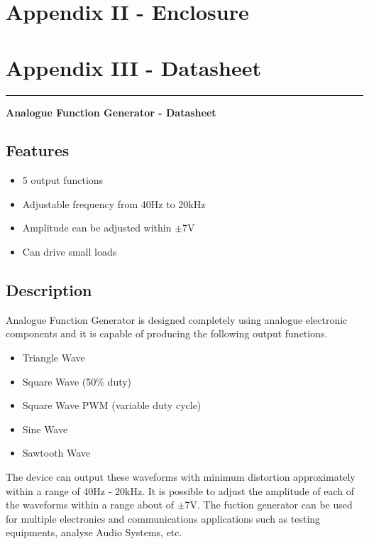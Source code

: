\documentclass[11pt]{article}
\begin{document}
\section{Appendix II - Enclosure}




\newpage

\section{Appendix III - Datasheet}

\rule{\textwidth}{0.5pt}

\begin{center}
    \begin{large}
    \textbf{Analogue Function Generator - Datasheet}
    \end{large}

\end{center}

\subsection*{Features}
\begin{itemize}
    \setlength\itemsep{-2mm}
    \item 5 output functions
    \item Adjustable frequency from 40Hz to 20kHz
    \item Amplitude can be adjusted within \(\pm\)7V
    \item Can drive small loads
\end{itemize}

\subsection*{Description}

Analogue Function Generator is designed completely using analogue electronic components and it is capable of producing the following output functions.
\begin{itemize}
    \setlength\itemsep{-2mm}
    \item Triangle Wave
    \item Square Wave (50\% duty)
    \item Square Wave PWM (variable duty cycle)
    \item Sine Wave
    \item Sawtooth Wave
\end{itemize}


The device can output these waveforms with minimum distortion approximately within a range of 40Hz - 20kHz. It is possible to adjust the amplitude of each of the waveforms within a range about of \(\pm\)7V. The fuction generator can be used for multiple electronics and communications applications such as testing equipments, analyse Audio Systems, etc.
\end{document}
